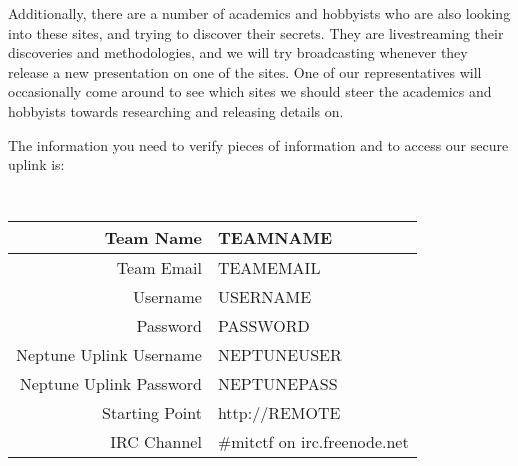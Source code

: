 \documentclass[10pt]{article}
\begin{document}
Additionally, there are a number of academics and hobbyists who are also looking
into these sites, and trying to discover their secrets. They are livestreaming
their discoveries and methodologies, and we will try broadcasting whenever they
release a new presentation on one of the sites. One of our representatives will
occasionally come around to see which sites we should steer the academics and
hobbyists towards researching and releasing details on.

The information you need to verify pieces of information and to access our
secure uplink is:
\vspace{0.2in}
{\tt\large
\begin{center}
\begin{tabular}{| r | l |}
\hline
Team Name & TEAMNAME\\\hline
Team Email & TEAMEMAIL\\\hline
Username & USERNAME\\\hline
Password & PASSWORD\\\hline
Neptune Uplink Username & NEPTUNEUSER\\\hline
Neptune Uplink Password & NEPTUNEPASS\\\hline
Starting Point & http://REMOTE\\\hline
IRC Channel & \#mitctf on irc.freenode.net\\\hline
\end{tabular}
\end{center}
}
\end{document}
